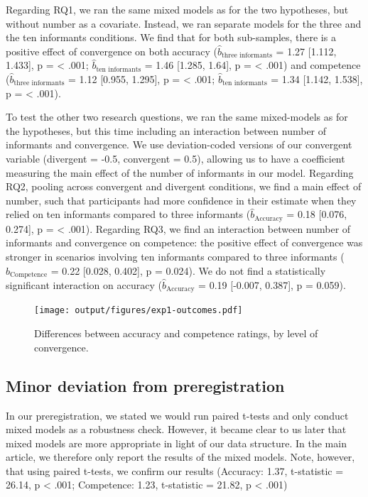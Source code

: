 \documentclass[
  doc,floatsintext]{apa6}
\begin{document}
Regarding RQ1, we ran the same mixed models as for the two hypotheses, but without number as a covariate. Instead, we ran separate models for the three and the ten informants conditions. We find that for both sub-samples, there is a positive effect of convergence on both accuracy (\(\hat{b}_{\text{three informants}}\) = 1.27 {[}1.112, 1.433{]}, p = \textless{} .001; \(\hat{b}_{\text{ten informants}}\) = 1.46 {[}1.285, 1.64{]}, p = \textless{} .001) and competence (\(\hat{b}_{\text{three informants}}\) = 1.12 {[}0.955, 1.295{]}, p = \textless{} .001; \(\hat{b}_{\text{ten informants}}\) = 1.34 {[}1.142, 1.538{]}, p = \textless{} .001).

To test the other two research questions, we ran the same mixed-models as for the hypotheses, but this time including an interaction between number of informants and convergence. We use deviation-coded versions of our convergent variable (divergent = -0.5, convergent = 0.5), allowing us to have a coefficient measuring the main effect of the number of informants in our model. Regarding RQ2, pooling across convergent and divergent conditions, we find a main effect of number, such that participants had more confidence in their estimate when they relied on ten informants compared to three informants (\(\hat{b}_{\text{Accuracy}}\) = 0.18 {[}0.076, 0.274{]}, p = \textless{} .001). Regarding RQ3, we find an interaction between number of informants and convergence on competence: the positive effect of convergence was stronger in scenarios involving ten informants compared to three informants (\(\hat{b}_{\text{Competence}}\) = 0.22 {[}0.028, 0.402{]}, p = 0.024). We do not find a statistically significant interaction on accuracy (\(\hat{b}_{\text{Accuracy}}\) = 0.19 {[}-0.007, 0.387{]}, p = 0.059).



\begin{figure}
\centering
\texttt{[image: output/figures/exp1-outcomes.pdf]}
\caption{\label{fig:exp1-outcomes}Differences between accuracy and competence ratings, by level of convergence.}
\end{figure}

\subsection{Minor deviation from preregistration}\label{minor-deviation-from-preregistration}

In our preregistration, we stated we would run paired t-tests and only conduct mixed models as a robustness check. However, it became clear to us later that mixed models are more appropriate in light of our data structure. In the main article, we therefore only report the results of the mixed models. Note, however, that using paired t-tests, we confirm our results (Accuracy: 1.37, t-statistic = 26.14, p \textless{} .001; Competence: 1.23, t-statistic = 21.82, p \textless{} .001)
\end{document}
